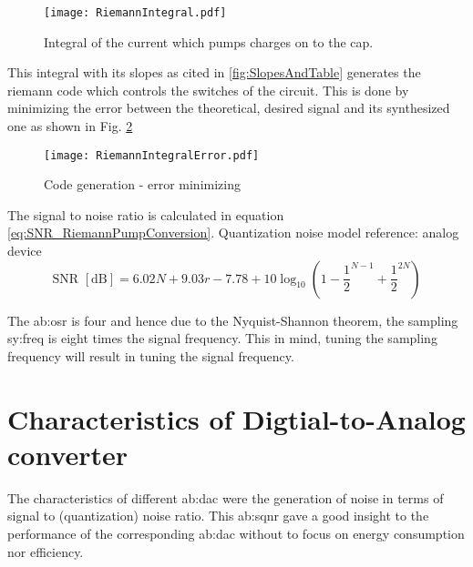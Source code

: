 \begin{figure}[ht]
	\centering
  \texttt{[image: RiemannIntegral.pdf]}
	\caption{Integral of the current which pumps charges on to the cap.}
	\label{fig:RiemannIntegral}
\end{figure}
This integral with its slopes as cited in \ref{fig:SlopesAndTable} generates the riemann code which controls the switches of the circuit. This is done by minimizing the error between the theoretical, desired signal and its synthesized one as shown in Fig. \ref{fig:RiemannIntegralError}
 \begin{figure}[ht]
	\centering
  \texttt{[image: RiemannIntegralError.pdf]}
	\caption{Code generation - error minimizing}
	\label{fig:RiemannIntegralError}
\end{figure}
The signal to noise ratio is calculated in equation \ref{eq:SNR_RiemannPumpConversion}. Quantization noise model {reference: analog device}
\begin{equation}
	\text{SNR } [\si{\dB}] = 6.02N + 9.03r - 7.78 + 10\log_{10}(1 - \frac{1}{2}^{N-1} + \frac{1}{2}^{2N})
	\label{eq:SNR_RiemannPumpConversion}
\end{equation}



The \gls{ab:osr} is four and hence due to the Nyquist-Shannon theorem, the sampling \gls{sy:freq} is eight times the signal frequency.
This in mind, tuning the sampling frequency will result in tuning the signal frequency.

\section{Characteristics of Digtial-to-Analog converter}
\label{ch:characteristics}
The characteristics of different \gls{ab:dac} were the generation of noise in terms of signal to (quantization) noise ratio.
This \gls{ab:sqnr} gave a good insight to the performance of the corresponding \gls{ab:dac} without to focus on energy consumption nor efficiency.


